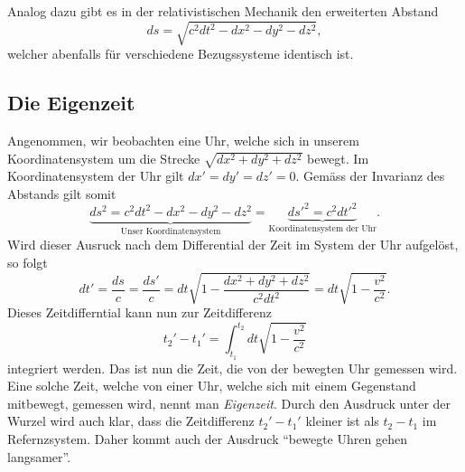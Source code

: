 Analog dazu gibt es in der relativistischen Mechanik den erweiterten Abstand
\begin{equation}
    ds = \sqrt{c^2dt^2 - dx^2 - dy^2 - dz^2},
\end{equation}
welcher abenfalls für verschiedene Bezugssysteme identisch ist.


\subsection{Die Eigenzeit 
\label{relativ:section:eigenzeit}}

Angenommen, wir beobachten eine Uhr,
welche sich in unserem Koordinatensystem um die Strecke
\(\sqrt{dx^2 + dy^2 + dz^2}\)
bewegt.
Im Koordinatensystem der Uhr gilt
\(dx' = dy' = dz' = 0\).
Gemäss der Invarianz des Abstands gilt somit
\begin{equation*}
    \underbrace{ds^2 = c^2 dt^2 - dx^2 - dy^2 - dz^2}_{\text{Unser Koordinatensystem}}
        = \underbrace{ds'^2 = c^2 dt'^2}_{\text{Koordinatensystem der Uhr}} .
\end{equation*}
Wird dieser Ausruck nach dem Differential der Zeit im System der Uhr aufgelöst,
so folgt
\begin{equation}
    dt' = \frac{ds}{c} = \frac{ds'}{c}
    = dt \sqrt{1 - \frac{dx^2+dy^2+dz^2}{c^2 dt^2}}
    = dt \sqrt{1 - \frac{v^2}{c^2}}.
\end{equation}
Dieses Zeitdifferntial kann nun zur Zeitdifferenz
\begin{equation}
    t_2' - t_1' = \int_{t_1}^{t_2} dt \sqrt{1 - \frac{v^2}{c^2}}
\end{equation}
integriert werden.
Das ist nun die Zeit, die von der bewegten Uhr gemessen wird.
Eine solche Zeit, welche von einer Uhr,
welche sich mit einem Gegenstand mitbewegt, gemessen wird,
nennt man \emph{Eigenzeit}.
Durch den Ausdruck unter der Wurzel wird auch klar,
dass die Zeitdifferenz \(t_2'- t_1'\) kleiner ist
als \(t_2 - t_1\) im Refernzsystem.
Daher kommt auch der Ausdruck
``bewegte Uhren gehen langsamer''.
